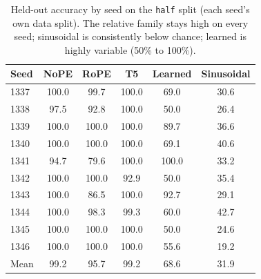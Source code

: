 \documentclass{article}
\begin{document}
\begin{table}[h]
  \centering
  \caption{Held-out accuracy by seed on the \texttt{half} split (each seed's own
  data split). The relative family stays high on every seed; sinusoidal is
  consistently below chance; learned is highly variable (50\% to 100\%).}
  \label{tab:perseed}
  \begin{tabular}{lccccc}
    \toprule
    Seed & NoPE & RoPE & T5 & Learned & Sinusoidal \\
    \midrule
    1337 & 100.0 &  99.7 & 100.0 &  69.0 & 30.6 \\
    1338 &  97.5 &  92.8 & 100.0 &  50.0 & 26.4 \\
    1339 & 100.0 & 100.0 & 100.0 &  89.7 & 36.6 \\
    1340 & 100.0 & 100.0 & 100.0 &  69.1 & 40.6 \\
    1341 &  94.7 &  79.6 & 100.0 & 100.0 & 33.2 \\
    1342 & 100.0 & 100.0 &  92.9 &  50.0 & 35.4 \\
    1343 & 100.0 &  86.5 & 100.0 &  92.7 & 29.1 \\
    1344 & 100.0 &  98.3 &  99.3 &  60.0 & 42.7 \\
    1345 & 100.0 & 100.0 & 100.0 &  50.0 & 24.6 \\
    1346 & 100.0 & 100.0 & 100.0 &  55.6 & 19.2 \\
    \midrule
    Mean & 99.2 & 95.7 & 99.2 & 68.6 & 31.9 \\
    \bottomrule
  \end{tabular}
\end{table}
\end{document}
